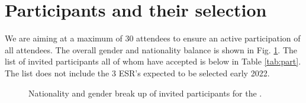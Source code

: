 \section{Participants and their selection}

We are aiming at a maximum of 30 attendees to ensure an active
participation of all attendees. The overall gender and nationality
balance is shown in Fig. \ref{fig:country}. The list of invited
participants all of whom have accepted is below in Table
\ref{tab:part}. The list does not include the 3 ESR's expected to be
selected early 2022.



\begin{figure}[!b]
  \centering 
  \caption{Nationality and gender break up of invited participants for
    the \sympe.}
  \label{fig:country}
\end{figure}




